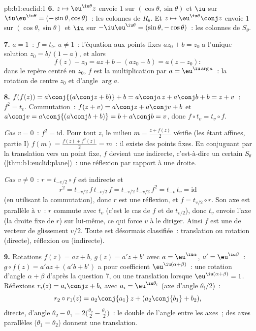 \begin{solution}{pb:b1:euclid:1}
\textbf{6.} $z \mapsto \eu^{\iu\theta}z$ envoie $1$ sur
$(\cos\theta, \sin\theta)$ et $\iu$ sur
$\iu\eu^{\iu\theta} = (-\sin\theta, \cos\theta)$~: les colonnes de
$R_\theta$. Et $z \mapsto \eu^{\iu\theta}\conj z$ envoie $1$ sur
$(\cos\theta, \sin\theta)$ et $\iu$ sur $-\iu\eu^{\iu\theta} =
(\sin\theta, -\cos\theta)$~: les colonnes de $S_\theta$.

\textbf{7.} $a = 1$~: $f = t_b$. $a \neq 1$~: l'équation aux points
fixes $az_0 + b = z_0$ a l'unique solution $z_0 = b/(1 -
a)$, et alors
\[
f(z) - z_0 = az + b - (az_0 + b) = a(z - z_0):
\]
dans le repère centré en $z_0$, $f$ est la multiplication par $a
= \eu^{\iu\arg a}$~: la rotation de centre $z_0$ et d'angle
$\arg a$.

\textbf{8.} $f(f(z)) = a\conj{(a\conj z + b)} + b = a\conj a\,z
+ a\conj b + b = z + v$~: $f^2 = t_v$. Commutation~: $f(z + v) =
a\conj z + a\conj v + b$ et $a\conj v = a\conj{(a\conj b + b)}
= b + a\conj b = v$, donc $f\circ t_v = t_v\circ f$.

\emph{Cas $v = 0$}~: $f^2 = \mathrm{id}$. Pour tout $z$, le
milieu $m = \frac{z + f(z)}2$ vérifie (les  étant
affines, partie I) $f(m) = \frac{f(z) + f^2(z)}{2} = m$~: il existe
des points fixes. En conjuguant par la translation vers un point
fixe, $f$ devient une   indirecte, c'est-à-dire un
certain $S_\theta$
(\cref{thm:b1:euclid:plane})~: une réflexion par rapport à une droite.

\emph{Cas $v \neq 0$}~: $r = t_{-v/2}\circ f$ est indirecte et
\[
r^2 = t_{-v/2}\,f\,t_{-v/2}\,f = t_{-v/2}\,t_{-v/2}\,f^2
= t_{-v}\,t_v = \mathrm{id}
\]
(en utilisant la commutation), donc $r$ est une réflexion, et $f =
t_{v/2}\circ r$. Son axe est parallèle à $v$~: $r$ commute avec
$t_v$ (c'est le cas de $f$ et de $t_{v/2}$), donc $t_v$ envoie l'axe
(la droite fixe de $r$) sur lui-même, ce qui force $v$ à le diriger.
Ainsi $f$ est une  de vecteur de glissement $v/2$.
Toute  est désormais classifiée~: translation ou rotation
(directe), réflexion ou  (indirecte).

\textbf{9.} Rotations $f(z) = az + b$, $g(z) = a'z + b'$ avec
$a = \eu^{\iu\alpha}$, $a' = \eu^{\iu\beta}$~: $g\circ f(z) =
a'az + (a'b + b')$ a pour coefficient 
$\eu^{\iu(\alpha+\beta)}$~: une rotation d'angle $\alpha + \beta$
d'après la question 7, ou une translation lorsque
$\eu^{\iu(\alpha+\beta)} = 1$. Réflexions $r_i(z) = a_i\conj z +
b_i$ avec $a_i = \eu^{\iu\theta_i}$ (axe d'angle $\theta_i/2$)~:
\[
r_2\circ r_1(z) = a_2\conj{a_1}\,z + (a_2\conj{b_1} + b_2),
\]
directe, d'angle $\theta_2 - \theta_1 = 2\bigl(\tfrac{\theta_2}2
- \tfrac{\theta_1}2\bigr)$~: le double de l'angle entre les axes~;
des axes parallèles ($\theta_1 = \theta_2$) donnent une translation.


\end{solution}
